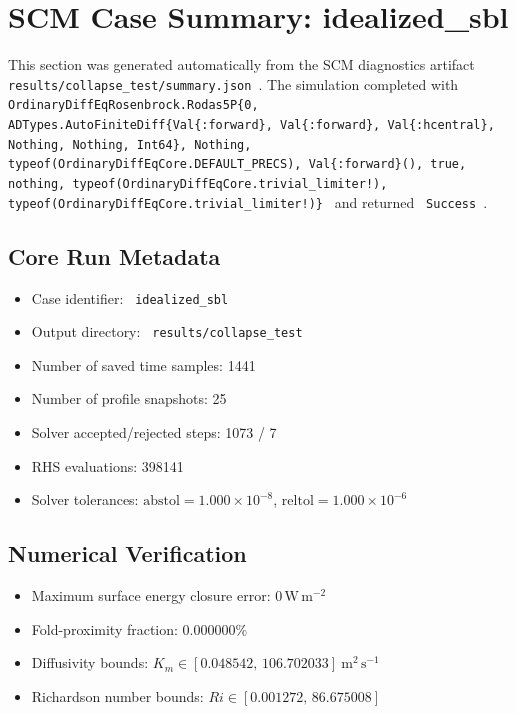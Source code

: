 \section{SCM Case Summary: idealized\_sbl}
\label{sec:scm_case_collapse_test_scm_case_report}

This section was generated automatically from the SCM diagnostics artifact
\texttt{ results/collapse\_test/summary.json }. The simulation completed with \texttt{ OrdinaryDiffEqRosenbrock.Rodas5P\{0, ADTypes.AutoFiniteDiff\{Val\{:forward\}, Val\{:forward\}, Val\{:hcentral\}, Nothing, Nothing, Int64\}, Nothing, typeof(OrdinaryDiffEqCore.DEFAULT\_PRECS), Val\{:forward\}(), true, nothing, typeof(OrdinaryDiffEqCore.trivial\_limiter!), typeof(OrdinaryDiffEqCore.trivial\_limiter!)\} }
and returned \texttt{ Success }.

\subsection{Core Run Metadata}
\begin{itemize}
  \item Case identifier: \texttt{ idealized\_sbl }
  \item Output directory: \texttt{ results/collapse\_test }
  \item Number of saved time samples: 1441
  \item Number of profile snapshots: 25
  \item Solver accepted/rejected steps: 1073 / 7
  \item RHS evaluations: 398141
  \item Solver tolerances: $\mathrm{abstol}=1.000 \times 10^{-8}$, $\mathrm{reltol}=1.000 \times 10^{-6}$
\end{itemize}

\subsection{Numerical Verification}
\begin{itemize}
  \item Maximum surface energy closure error:
  $0\,\mathrm{W\,m^{-2}}$
  \item Fold-proximity fraction:
  $0.000000\%$
  \item Diffusivity bounds:
  $K_m \in [0.048542,\,106.702033]~\mathrm{m^2\,s^{-1}}$
  \item Richardson number bounds:
  $Ri \in [0.001272,\,86.675008]$
\end{itemize}

